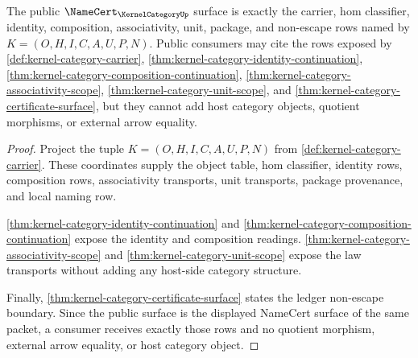 \begin{theorem}
\label{thm:kernel-category-namecert-public-surface}
The public $\NameCert_{\KernelCategoryUp}$ surface is exactly the carrier, hom classifier, identity, composition, associativity, unit, package, and non-escape rows named by $K=(O,H,I,C,A,U,P,N)$. Public consumers may cite the rows exposed by \autoref{def:kernel-category-carrier}, \autoref{thm:kernel-category-identity-continuation}, \autoref{thm:kernel-category-composition-continuation}, \autoref{thm:kernel-category-associativity-scope}, \autoref{thm:kernel-category-unit-scope}, and \autoref{thm:kernel-category-certificate-surface}, but they cannot add host category objects, quotient morphisms, or external arrow equality.
\end{theorem}
\begin{proof}
Project the tuple $K=(O,H,I,C,A,U,P,N)$ from \autoref{def:kernel-category-carrier}. These coordinates supply the object table, hom classifier, identity rows, composition rows, associativity transports, unit transports, package provenance, and local naming row.

\autoref{thm:kernel-category-identity-continuation} and \autoref{thm:kernel-category-composition-continuation} expose the identity and composition readings. \autoref{thm:kernel-category-associativity-scope} and \autoref{thm:kernel-category-unit-scope} expose the law transports without adding any host-side category structure.

Finally, \autoref{thm:kernel-category-certificate-surface} states the ledger non-escape boundary. Since the public surface is the displayed NameCert surface of the same packet, a consumer receives exactly those rows and no quotient morphism, external arrow equality, or host category object.
\end{proof}

